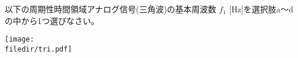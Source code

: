 以下の周期性時間領域アナログ信号(三角波)の基本周波数 $f_1$ [Hz]を選択肢a〜dの中から1つ選びなさい。

\centering\texttt{[image: \\filedir/tri.pdf]}
